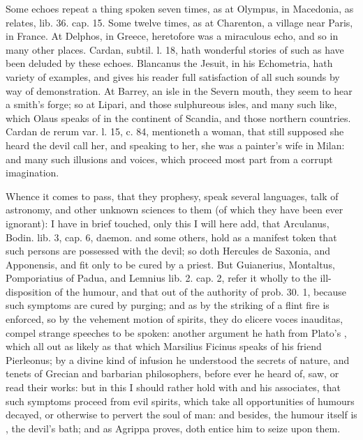 {Some echoes repeat a thing spoken seven times, as at Olympus, in
Macedonia, as \Pliny{} relates, lib. 36. cap. 15. Some twelve times, as at
Charenton, a village near Paris, in France. At Delphos, in Greece,
heretofore was a miraculous echo, and so in many other places. Cardan,
subtil. l. 18, hath wonderful stories of such as have been deluded by
these echoes. Blancanus the Jesuit, in his Echometria, hath variety of
examples, and gives his reader full satisfaction of all such sounds by
way of demonstration. At Barrey, an isle in the Severn mouth,
they seem to hear a smith's forge; so at Lipari, and those sulphureous
isles, and many such like, which Olaus speaks of in the continent of
Scandia, and those northern countries. Cardan de rerum var. l. 15, c.
84, mentioneth a woman, that still supposed she heard the devil call
her, and speaking to her, she was a painter's wife in Milan: and many
such illusions and voices, which proceed most part from a corrupt
imagination.

Whence it comes to pass, that they prophesy, speak several languages, talk of
astronomy, and other unknown sciences to them (of which they have been ever
ignorant): I have in brief touched, only this I will here
add, that Arculanus, Bodin. lib. 3, cap. 6, daemon. and some others,
 hold as a manifest token that such persons are possessed
with the devil; so doth Hercules de Saxonia, and
Apponensis, and fit only to be cured by a priest. But Guianerius, Montaltus, Pomporiatius
of Padua, and Lemnius lib. 2. cap. 2, refer it wholly to the ill-disposition of
the humour, and that out of the authority of \Aristotle{}
prob. 30. 1, because such symptoms are cured by purging; and as by the striking
of a flint fire is enforced, so by the vehement motion of spirits, they do
elicere voces inauditas, compel strange speeches to be spoken: another argument
he hath from Plato's , which all out as likely as that which
Marsilius Ficinus speaks of his friend Pierleonus; by a
divine kind of infusion he understood the secrets of nature, and tenets of
Grecian and barbarian philosophers, before ever he heard of, saw, or read their
works: but in this I should rather hold with \Avicenna{} and his associates, that
such symptoms proceed from evil spirits, which take all opportunities of
humours decayed, or otherwise to pervert the soul of man: and besides, the
humour itself is , the devil's bath; and as Agrippa proves, doth
entice him to seize upon them.
}
